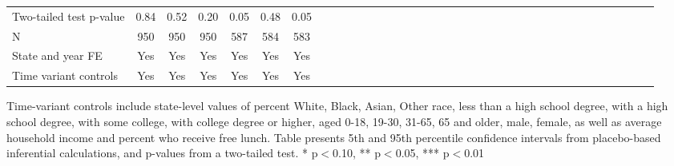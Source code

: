 \begin{table}[htbp]
\begin{center}
\begin{threeparttable}
\begin{tabular}{l*{6}{c c c c c c}}
Two-tailed test p-value&        0.84   &        0.52   &        0.20   &     \cellcolor[cmyk]{0.2,0,0,0}     0.05   &      \cellcolor[cmyk]{0.2,0,0,0}    0.48   &     \cellcolor[cmyk]{0.2,0,0,0}     0.05   \\
N                   &         950   &         950   &         950   &         587   &         584   &         583   \\
\midrule
State and year FE                              & Yes   & Yes   & Yes   & Yes   & Yes   & Yes            \\
Time variant controls                  & Yes   & Yes   & Yes   & Yes   & Yes   & Yes            \\
\bottomrule
\end{tabular}
\begin{tablenotes}
\tiny
\item Time-variant controls include state-level values of percent White, Black, Asian, Other race, less than a high school degree, with a high school degree, with some college, with college degree or higher, aged 0-18, 19-30, 31-65, 65 and older, male, female, as well as average household income and percent who receive free lunch.  Table presents 5th and 95th percentile confidence intervals from placebo-based inferential calculations, and p-values from a two-tailed test. * p$<$0.10, ** p$<$0.05, *** p$<$0.01
\end{tablenotes}
\end{threeparttable}
\end{center}
\end{table}
